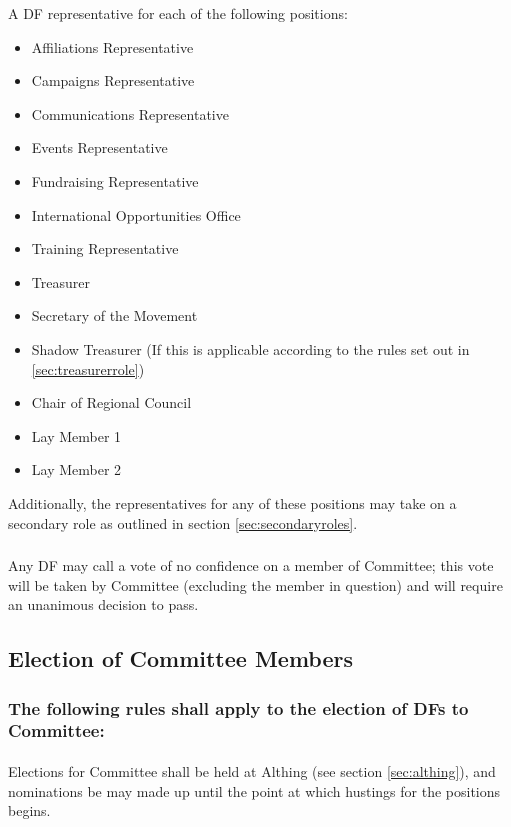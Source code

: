 \documentclass[a4paper, 12pt]{article}
\begin{document}
A DF representative for each of the following positions:
\begin{itemize}
\item Affiliations Representative
\item Campaigns Representative
\item Communications Representative
\item Events Representative
\item Fundraising Representative
\item International Opportunities Office
\item Training Representative
\item Treasurer
\item Secretary of the Movement
\item Shadow Treasurer (If this is applicable according to the rules set out in \ref{sec:treasurerrole})
\item Chair of Regional Council
\item Lay Member 1
\item Lay Member 2
\end{itemize}

Additionally, the representatives for any of these positions may take on a secondary role as outlined in section \ref{sec:secondaryroles}.

\subsubsection{}
Any DF may call a vote of no confidence on a member of Committee; this vote will be taken by Committee (excluding the member in question) and will require an unanimous decision to pass.

\subsection{Election of Committee Members}
\label{sec:election}
\subsubsection{The following rules shall apply to the election of DFs to Committee:}
\paragraph{}
Elections for Committee shall be held at Althing (see section \ref{sec:althing}), and nominations be may made up until the point at which hustings for the positions begins.
\end{document}
